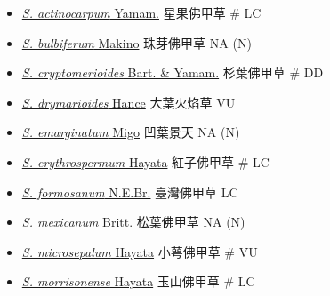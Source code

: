 \begin{itemize}
  \begin{itemize}
        \item[] \href{http://www.theplantlist.org/tpl1.1/search?q=Sedum+actinocarpum}{\textit{S. actinocarpum} Yamam.}   星果佛甲草  \# LC
        \item[] \href{http://www.theplantlist.org/tpl1.1/search?q=Sedum+bulbiferum}{\textit{S. bulbiferum} Makino}   珠芽佛甲草   NA (N)
        \item[] \href{http://www.theplantlist.org/tpl1.1/search?q=Sedum+cryptomerioides}{\textit{S. cryptomerioides} Bart. \& Yamam.}   杉葉佛甲草  \# DD
        \item[] \href{http://www.theplantlist.org/tpl1.1/search?q=Sedum+drymarioides}{\textit{S. drymarioides} Hance}   大葉火焰草   VU
        \item[] \href{http://www.theplantlist.org/tpl1.1/search?q=Sedum+emarginatum}{\textit{S. emarginatum} Migo}   凹葉景天   NA (N)
        \item[] \href{http://www.theplantlist.org/tpl1.1/search?q=Sedum+erythrospermum}{\textit{S. erythrospermum} Hayata}   紅子佛甲草  \# LC
        \item[] \href{http://www.theplantlist.org/tpl1.1/search?q=Sedum+formosanum}{\textit{S. formosanum} N.E.Br.}   臺灣佛甲草   LC
        \item[] \href{http://www.theplantlist.org/tpl1.1/search?q=Sedum+mexicanum}{\textit{S. mexicanum} Britt.}   松葉佛甲草   NA (N)
        \item[] \href{http://www.theplantlist.org/tpl1.1/search?q=Sedum+microsepalum}{\textit{S. microsepalum} Hayata}   小萼佛甲草  \# VU
        \item[] \href{http://www.theplantlist.org/tpl1.1/search?q=Sedum+morrisonense}{\textit{S. morrisonense} Hayata}   玉山佛甲草  \# LC

\end{itemize}
\end{itemize}
